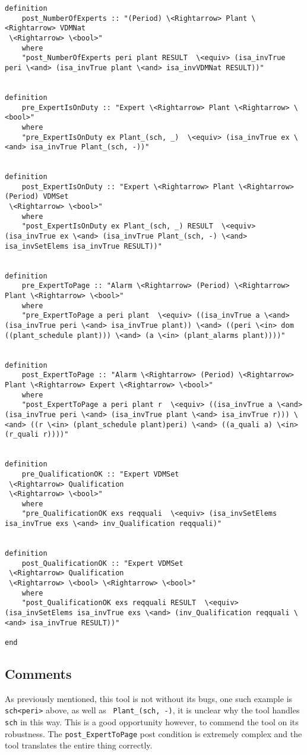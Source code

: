\begin{lstlisting}[language=Isabelle]
definition
	post_NumberOfExperts :: "(Period) \<Rightarrow> Plant \<Rightarrow> VDMNat
 \<Rightarrow> \<bool>"
    where
    "post_NumberOfExperts peri plant RESULT  \<equiv> (isa_invTrue peri \<and> (isa_invTrue plant \<and> isa_invVDMNat RESULT))"


definition
	pre_ExpertIsOnDuty :: "Expert \<Rightarrow> Plant \<Rightarrow> \<bool>"
    where
    "pre_ExpertIsOnDuty ex Plant_(sch, _)  \<equiv> (isa_invTrue ex \<and> isa_invTrue Plant_(sch, -))"


definition
	post_ExpertIsOnDuty :: "Expert \<Rightarrow> Plant \<Rightarrow> (Period) VDMSet
 \<Rightarrow> \<bool>"
    where
    "post_ExpertIsOnDuty ex Plant_(sch, _) RESULT  \<equiv> (isa_invTrue ex \<and> (isa_invTrue Plant_(sch, -) \<and> isa_invSetElems isa_invTrue RESULT))"


definition
	pre_ExpertToPage :: "Alarm \<Rightarrow> (Period) \<Rightarrow> Plant \<Rightarrow> \<bool>"
    where
    "pre_ExpertToPage a peri plant  \<equiv> ((isa_invTrue a \<and> (isa_invTrue peri \<and> isa_invTrue plant)) \<and> ((peri \<in> dom ((plant_schedule plant))) \<and> (a \<in> (plant_alarms plant))))"


definition
	post_ExpertToPage :: "Alarm \<Rightarrow> (Period) \<Rightarrow> Plant \<Rightarrow> Expert \<Rightarrow> \<bool>"
    where
    "post_ExpertToPage a peri plant r  \<equiv> ((isa_invTrue a \<and> (isa_invTrue peri \<and> (isa_invTrue plant \<and> isa_invTrue r))) \<and> ((r \<in> (plant_schedule plant)peri) \<and> ((a_quali a) \<in> (r_quali r))))"


definition
	pre_QualificationOK :: "Expert VDMSet
 \<Rightarrow> Qualification
 \<Rightarrow> \<bool>"
    where
    "pre_QualificationOK exs reqquali  \<equiv> (isa_invSetElems isa_invTrue exs \<and> inv_Qualification reqquali)"


definition
	post_QualificationOK :: "Expert VDMSet
 \<Rightarrow> Qualification
 \<Rightarrow> \<bool> \<Rightarrow> \<bool>"
    where
    "post_QualificationOK exs reqquali RESULT  \<equiv> (isa_invSetElems isa_invTrue exs \<and> (inv_Qualification reqquali \<and> isa_invTrue RESULT))"

end
\end{lstlisting}

\subsection{Comments}
As previously mentioned, this tool is not without its bugs, one such example is \lstinline[language=Isabelle]{sch<peri>} above, as well as \lstinline[language=Isabelle]{ Plant_(sch, -)}, it is unclear why the tool handles \lstinline[language=Isabelle]{sch} in this way. This is a good opportunity however, to commend the tool on its robustness. The  \lstinline[language=Isabelle]{post_ExpertToPage} post condition is extremely complex and the tool translates the entire thing correctly.

